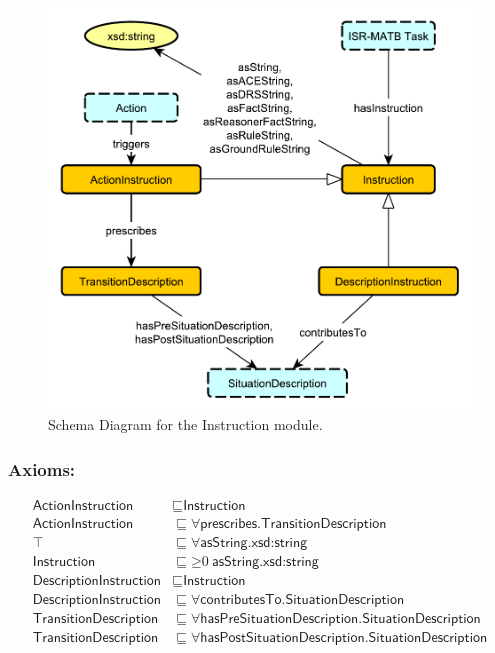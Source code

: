 \begin{figure}[h!]
\begin{center}
\includegraphics[width=.8\textwidth]{resources/Instruction.pdf}
\end{center}
\caption{Schema Diagram for the \textsf{Instruction} module.}
\label{fig:instruction}
\end{figure}

\subsubsection*{Axioms:}

\begin{align}
\textsf{ActionInstruction} &\sqsubseteq \textsf{Instruction} \\
\textsf{ActionInstruction} &\sqsubseteq \forall \textsf{prescribes.TransitionDescription} \\
\top &\sqsubseteq \forall \textsf{asString.xsd:string} \\
\textsf{Instruction} &\sqsubseteq \mathord{\geq}0~\textsf{asString.xsd:string} \\
\textsf{DescriptionInstruction} &\sqsubseteq \textsf{Instruction} \\
\textsf{DescriptionInstruction} &\sqsubseteq \forall \textsf{contributesTo.SituationDescription} \\
\textsf{TransitionDescription} &\sqsubseteq \forall \textsf{hasPreSituationDescription.SituationDescription} \\
\textsf{TransitionDescription} &\sqsubseteq \forall \textsf{hasPostSituationDescription.SituationDescription} 
\end{align}

